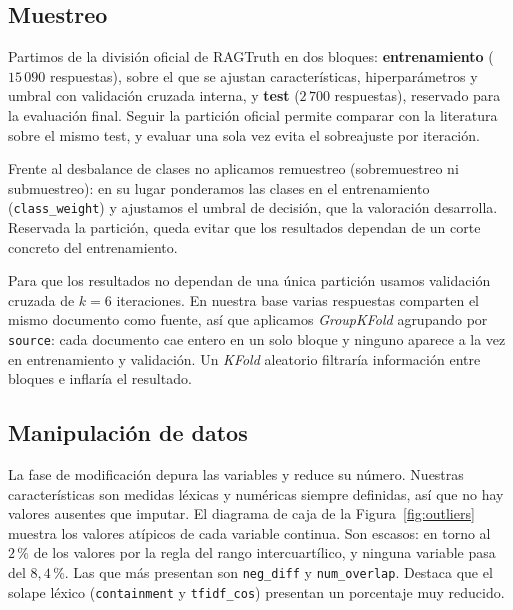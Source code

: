 \documentclass[12pt,a4paper]{report}
\theoremstyle{definition}
\newcommand{\tc}[1]{\texttt{#1}}
\begin{document}
\subsection{Muestreo}
\label{sub:sample}

Partimos de la división oficial de RAGTruth en dos bloques: \textbf{entrenamiento} ($15\,090$
respuestas), sobre el que se ajustan características, hiperparámetros y umbral con validación cruzada
interna, y \textbf{test} ($2\,700$ respuestas), reservado para la evaluación final. Seguir la
partición oficial permite comparar con la literatura sobre el mismo test, y evaluar una sola vez evita
el sobreajuste por iteración.

Frente al desbalance de clases no aplicamos remuestreo (sobremuestreo ni submuestreo): en su lugar
ponderamos las clases en el entrenamiento (\tc{class\_weight}) y ajustamos el umbral de decisión, que
la valoración desarrolla. Reservada la partición, queda evitar que los resultados dependan de un corte
concreto del entrenamiento.

Para que los resultados no dependan de una única partición usamos validación cruzada de $k=6$
iteraciones. En nuestra base varias respuestas comparten el mismo documento como fuente, así que
aplicamos \emph{GroupKFold} agrupando por \tc{source}: cada documento cae entero en un solo bloque y
ninguno aparece a la vez en entrenamiento y validación. Un \emph{KFold} aleatorio filtraría
información entre bloques e inflaría el resultado.

\subsection{Manipulación de datos}
\label{sub:modify}

La fase de modificación depura las variables y reduce su número. Nuestras características son medidas
léxicas y numéricas siempre definidas, así que no hay valores ausentes que imputar. El diagrama de caja
de la Figura~\ref{fig:outliers} muestra los valores atípicos de cada variable continua. Son escasos:
en torno al $2\,\%$ de los valores por la regla del rango intercuartílico, y ninguna variable pasa del
$8{,}4\,\%$. Las que más presentan son \tc{neg\_diff} y \tc{num\_overlap}. Destaca que el solape léxico
(\tc{containment} y \tc{tfidf\_cos}) presentan un porcentaje muy reducido.
\end{document}
